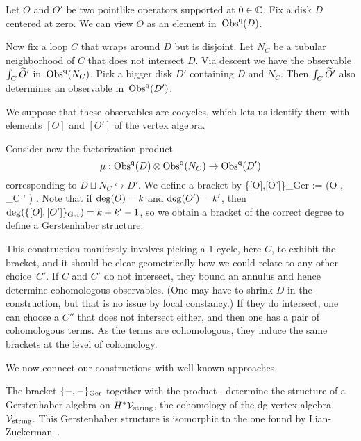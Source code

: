 Let $O$ and $O'$ be two pointlike operators supported at $0 \in \CC$. 
Fix a disk $D$ centered at zero.
We can view $O$ as an element in~$\Obs^\q(D)$.

Now fix a loop $C$ that wraps around $D$ but is disjoint.
Let $N_{C}$ be a tubular neighborhood of $C$ that does not intersect $D$. 
Via descent we have the observable $\int_C \Tilde{O}'$ in~$\Obs^\q(N_C)$. 
Pick a bigger disk $D'$ containing $D$ and $N_C$.
Then $\int_C \Tilde{O}'$ also determines an observable in~$\Obs^\q(D')$. 

We suppose that these observables are cocycles, 
which lets us identify them with elements $[O]$ and $[O']$ of the vertex algebra.

Consider now the factorization product
\[
\mu : \Obs^\q(D) \tensor \Obs^\q (N_{C}) \to \Obs^\q(D')
\] 
corresponding to $D \sqcup N_C \hookrightarrow D'$. 
We define a bracket by 
\ben
\{[O],[O']\}_{\rm Ger} := \mu \left(O , \int_{C} ' \right) .
\een 
Note that if ${\rm deg}(O) = k$ and ${\rm deg}(O') = k'$, then ${\rm deg}(\{[O],[O']\}_{\rm Ger}) = k+k' -1$, 
so we obtain a bracket of the correct degree to define a Gerstenhaber structure. 

\begin{rmk}
This construction manifestly involves picking a 1-cycle, here $C$, to exhibit the bracket, 
and it should be clear geometrically how we could relate to any other choice~$C'$.
If $C$ and $C'$ do not intersect, they bound an annulus and hence determine cohomologous observables.
(One may have to shrink $D$ in the construction, but that is no issue by local constancy.)
If they do intersect, one can choose a $C''$ that does not intersect either, and then one has a pair of cohomologous terms.
As the terms are cohomologous, they induce the same brackets at the level of cohomology.
\end{rmk}

We now connect our constructions with well-known approaches.

\begin{prop} 
The bracket $\{-,-\}_{\rm Ger}$ together with the product $\cdot$ determine the structure of a Gerstenhaber algebra on $H^* \cV_{\rm string}$, 
the cohomology of the dg vertex algebra $\cV_{\rm string}$. 
This Gerstenhaber structure is isomorphic to the one found by Lian-Zuckerman~\cite{LZ1}.
\end{prop}

